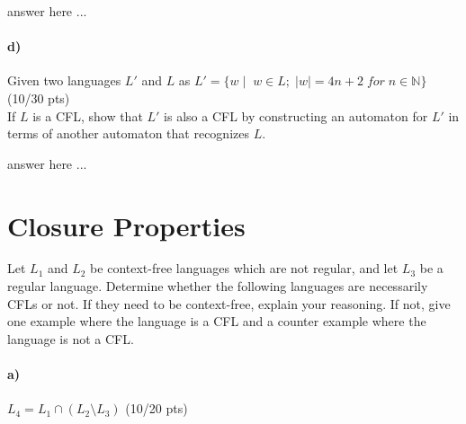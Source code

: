 \documentclass[a4paper,12pt]{article}
\begin{document}
\begin{tcolorbox}
answer here ...
\vspace{19cm} %
\end{tcolorbox}

\paragraph{d)} Given two languages $L'$ and $L$ as $L'=\{w \mid \; w\in L; \; |w|=4n+2 \; for\; n\in \mathbb{N} \}$
\hfill \small{(10/30 pts)} \\
If $L$ is a CFL, show that $L'$ is also a CFL by constructing an automaton for $L'$ in terms of another automaton that recognizes $L$. \\


\begin{tcolorbox}
 answer here ...
\vspace{8cm} %
\end{tcolorbox}






\newpage
\section{Closure Properties \hfill {}}

Let $L_1$ and $L_2$ be context-free languages which are not regular, and let $L_3$ be a regular language. Determine whether the following languages are necessarily CFLs or not. If they need to be context-free, explain your reasoning. If not, give one example where the language is a CFL and a counter example where the language is not a CFL. \\

\paragraph{a)} $L_4 = L_1 \cap (L_2 \setminus L_3)$ \hfill \small{(10/20 pts)} \\
\end{document}
